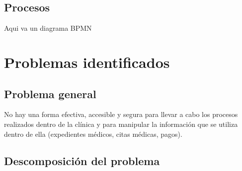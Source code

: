 \subsection{Procesos}

Aqui va un diagrama BPMN

\section{Problemas identificados}

\subsection{Problema general}

No hay una forma efectiva, accesible y segura para llevar a cabo los procesos realizados dentro de la cl\'inica y para manipular la informaci\'on que se utiliza dentro de ella (expedientes m\'edicos, citas m\'edicas, pagos). 

\subsection{Descomposición del problema}

